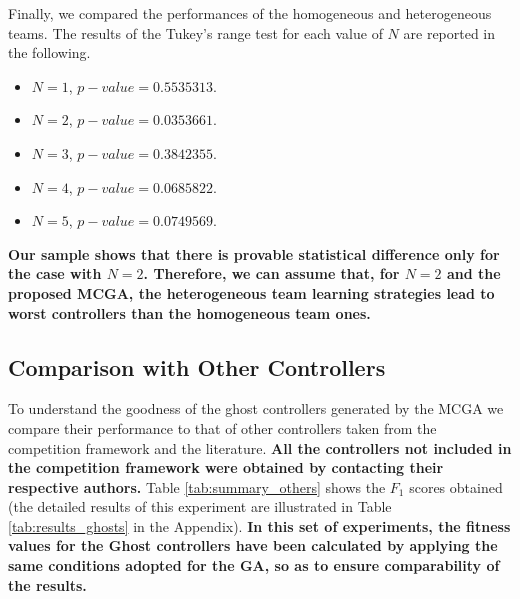 \documentclass[journal]{IEEEtran}
\begin{document}
Finally, we compared the performances of the homogeneous and heterogeneous teams. The results of the Tukey's range test for each value of $N$ are reported in the following.

\begin{itemize}
\item $N=1$, $p-value = 0.5535313$.
\item $N=2$, $p-value = 0.0353661$.
\item $N=3$, $p-value = 0.3842355$.
\item $N=4$, $p-value = 0.0685822$.
\item $N=5$, $p-value = 0.0749569$.
\end{itemize}

\textbf{Our sample shows that there is provable statistical difference only for the case with $N=2$. Therefore, we can assume that, for $N=2$ and the proposed MCGA, the heterogeneous team learning strategies lead to worst controllers than the homogeneous team ones.}

\subsection{Comparison with Other Controllers}
To understand the goodness of the ghost controllers generated by the MCGA we compare their performance to that of other controllers taken from the competition framework and the literature. \textbf{All the controllers not included in the competition framework were obtained by contacting their respective authors.} Table \ref{tab:summary_others} shows the $F_1$ scores obtained (the detailed results of this experiment are illustrated in Table \ref{tab:results_ghosts} in the Appendix). \textbf{In this set of experiments, the fitness values for the Ghost controllers have been calculated by applying the same conditions adopted for the GA, so as to ensure comparability of the results.}
\end{document}
